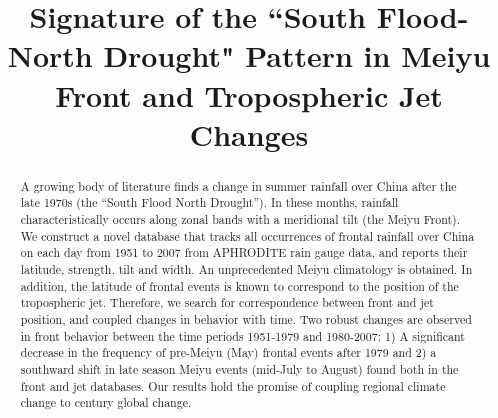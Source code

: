 \documentclass[draft,grl]{AGUTeX}
\begin{document}
%
%


\title{Signature of the ``South Flood-North Drought" Pattern in Meiyu Front and Tropospheric Jet Changes}

%
%






%
%


\begin{abstract}
A growing body of literature finds a change in summer rainfall over China after the late 1970s (the ``South Flood North Drought''). In these months, rainfall characteristically occurs along zonal bands with a meridional tilt (the Meiyu Front). We construct a novel database that tracks all occurrences of frontal rainfall over China on each day from 1951 to 2007 from APHRODITE rain gauge data, and reports their latitude, strength, tilt and width. An unprecedented Meiyu climatology is obtained. In addition, the latitude of frontal events is known to correspond to the position of the tropospheric jet. Therefore, we search for correspondence between front and jet position, and coupled changes in behavior with time. Two robust changes are observed in front behavior between the time periods 1951-1979 and 1980-2007: 1) A significant decrease in the frequency of pre-Meiyu (May) frontal events after 1979 and 2) a southward shift in late season Meiyu events (mid-July to August) found both in the front and jet databases. Our results hold the promise of coupling regional climate change to  century global change.


\end{abstract}
\end{document}
